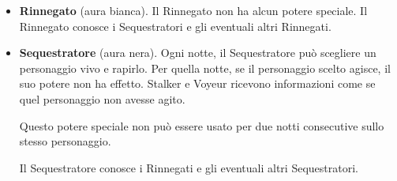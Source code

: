 \documentclass[a4paper,10pt]{article}
\begin{document}
\begin{itemize}
 \item {\bf Rinnegato} (aura bianca). Il Rinnegato non ha alcun potere speciale.
Il Rinnegato conosce i Sequestratori e gli eventuali altri Rinnegati.

 \item {\bf Sequestratore} (aura nera). Ogni notte, il Sequestratore può
scegliere un personaggio vivo e rapirlo. Per quella notte, se il personaggio
scelto agisce, il suo potere non ha effetto.
 Stalker e Voyeur ricevono informazioni come se quel personaggio non avesse
agito.
 
 Questo potere speciale non può essere usato per due notti consecutive sullo
stesso personaggio.
 
 Il Sequestratore conosce i Rinnegati e gli eventuali altri Sequestratori.


\end{itemize}
\end{document}
